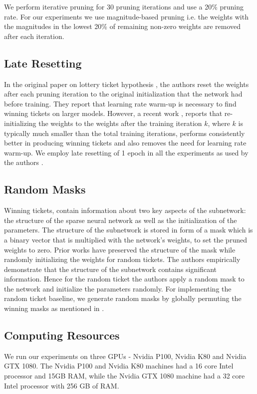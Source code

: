 \documentclass{article}
\begin{document}
We perform iterative pruning for 30 pruning iterations and use a 20\% pruning rate. For our experiments we use magnitude-based pruning i.e. the weights with the magnitudes in the lowest 20\% of remaining non-zero weights are removed after each iteration. 


\subsection{Late Resetting}
In the original paper on lottery ticket hypothesis \cite{lth_orig_paper}, the authors reset the weights after each pruning iteration to the original initialization that the network had before training. They report that learning rate warm-up is necessary to find winning tickets on larger models. However, a recent work  \cite{DBLP:journals/corr/abs-1903-01611}, reports that re-initializing the weights to the weights after the training iteration $k$, where $k$ is typically much smaller than the total training iterations, performs consistently better in producing winning tickets and also removes the need for learning rate warm-up. We employ late resetting of 1 epoch in all the experiments as used by the authors \cite{repro_paper}.



\subsection{Random Masks}
Winning tickets, contain information about two key aspects of the subnetwork: the structure of the sparse neural network as well as the initialization of the parameters. The structure of the subnetwork is stored in form of a mask which is a binary vector that is multiplied with the network's weights, to set the pruned weights to zero. Prior works have preserved the structure of the mask while randomly initializing the weights for random tickets. The authors \cite{repro_paper} empirically demonstrate that the structure of the subnetwork contains significant information. Hence for the random ticket the authors apply a random mask to the network and initialize the parameters randomly. For implementing the random ticket baseline, we generate random masks by globally permuting the winning masks as mentioned in \cite{repro_paper}. 



\subsection{Computing Resources}
We run our experiments on three GPUs - Nvidia P100, Nvidia K80 and Nvidia GTX 1080. The Nvidia P100 and Nvidia K80 machines had a 16 core Intel processor and 15GB RAM, while the Nvidia GTX 1080 machine had a 32 core Intel processor with 256 GB of RAM.
\end{document}
